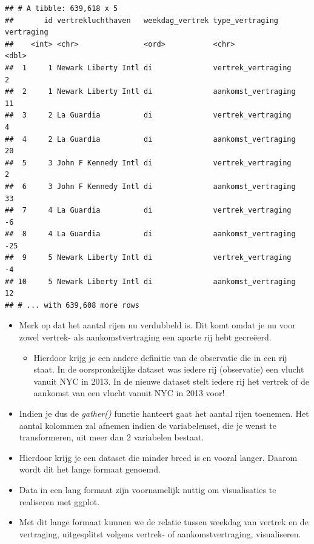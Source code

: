 \documentclass[]{tufte-book}
\providecommand{\tightlist}{%
  \setlength{\itemsep}{0pt}\setlength{\parskip}{0pt}}
\begin{document}
\begin{verbatim}
## # A tibble: 639,618 x 5
##       id vertrekluchthaven   weekdag_vertrek type_vertraging     vertraging
##    <int> <chr>               <ord>           <chr>                    <dbl>
##  1     1 Newark Liberty Intl di              vertrek_vertraging           2
##  2     1 Newark Liberty Intl di              aankomst_vertraging         11
##  3     2 La Guardia          di              vertrek_vertraging           4
##  4     2 La Guardia          di              aankomst_vertraging         20
##  5     3 John F Kennedy Intl di              vertrek_vertraging           2
##  6     3 John F Kennedy Intl di              aankomst_vertraging         33
##  7     4 La Guardia          di              vertrek_vertraging          -6
##  8     4 La Guardia          di              aankomst_vertraging        -25
##  9     5 Newark Liberty Intl di              vertrek_vertraging          -4
## 10     5 Newark Liberty Intl di              aankomst_vertraging         12
## # ... with 639,608 more rows
\end{verbatim}

\begin{itemize}
\tightlist
\item
  Merk op dat het aantal rijen nu verdubbeld is. Dit komt omdat je nu voor zowel vertrek- als aankomstvertraging een aparte rij hebt gecreëerd.

  \begin{itemize}
  \tightlist
  \item
    Hierdoor krijg je een andere definitie van de observatie die in een rij staat. In de oorspronkelijke dataset was iedere rij (observatie) een vlucht vanuit NYC in 2013. In de nieuwe dataset stelt iedere rij het vertrek of de aankomst van een vlucht vanuit NYC in 2013 voor!
  \end{itemize}
\item
  Indien je dus de \emph{gather()} functie hanteert gaat het aantal rijen toenemen. Het aantal kolommen zal afnemen indien de variabelenset, die je wenst te transformeren, uit meer dan 2 variabelen bestaat.
\item
  Hierdoor krijg je een dataset die minder breed is en vooral langer. Daarom wordt dit het lange formaat genoemd.
\item
  Data in een lang formaat zijn voornamelijk nuttig om visualisaties te realiseren met ggplot.
\item
  Met dit lange formaat kunnen we de relatie tussen weekdag van vertrek en de vertraging, uitgesplitst volgens vertrek- of aankomstvertraging, visualiseren.
\end{itemize}
\end{document}
